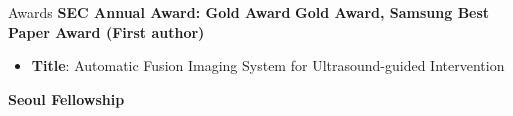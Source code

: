 \begin{rubric}{Awards}
    \entry*[2015] \textbf{SEC Annual Award: Gold Award}
    \entry*[2014] \textbf{Gold Award, Samsung Best Paper Award (First author)}
        \begin{itemize}[leftmargin=1em, itemsep=0em, labelsep=0.5em,topsep=0.5em]
            \item \textbf{Title}: Automatic Fusion Imaging System for Ultrasound-guided Intervention
        \end{itemize}
        \vspace{1em}
    \entry*[2009] \textbf{Seoul Fellowship}
\end{rubric}